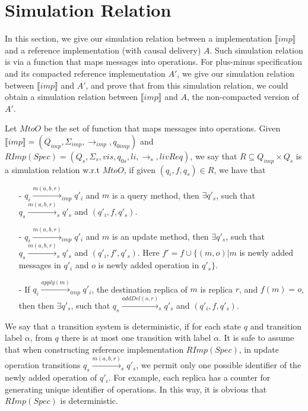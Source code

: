 
\section{Simulation Relation}
\label{sec:simulation relation}

In this section, we give our simulation relation between a implementation $\llbracket imp \rrbracket$ and a reference implementation (with causal delivery) $A$. Such simulation relation is via a function that maps messages into operations. For plus-minus specification and its compacted reference implementation $A'$, we give our simulation relation between $\llbracket imp \rrbracket$ and $A'$, and prove that from this simulation relation, we could obtain a simulation relation between $\llbracket imp \rrbracket$ and $A$, the non-compacted version of $A'$. 

Let $MtoO$ be the set of function that maps messages into operations. Given $\llbracket imp \rrbracket = (Q_{imp},\Sigma_{imp},\rightarrow_{imp},q_{0imp})$ and $RImp(Spec) = (Q_s,\Sigma_s,vis,q_{0s},li,\rightarrow_s,livReq)$, we say that $R \subseteq Q_{imp} \times Q_s$ is a simulation relation w.r.t $MtoO$, if given $(q_i,f,q_s) \in R$, we have that  

\begin{itemize}
\setlength{\itemsep}{0.5pt}
\item[-] $q_i {\xrightarrow{m(a,b,r)}}_{imp} q'_i$ and $m$ is a query method, then $\exists q'_s$, such that $q_s {\xrightarrow{m(a,b,r)}}_s q'_s$ and $(q'_i,f,q'_s)$. 

\item[-] $q_i {\xrightarrow{m(a,b,r)}}_{imp} q'_i$ and $m$ is an update method, then $\exists q'_s$, such that $q_s {\xrightarrow{m(a,b,r)}}_s q'_s$ and $(q'_i,f',q'_s)$. Here $f' = f \cup \{ (m,o) \vert m$ is newly added messages in $q'_i$ and $o$ is newly added operation in $q'_s\}$. 

\item[-] If $q_i {\xrightarrow{apply(m)}}_{imp} q'_i$, the destination replica of $m$ is replica $r$, and $f(m)=o$, then then $\exists q'_s$, such that $q_s {\xrightarrow{addDel(o,r)}}_s q'_s$ and $(q'_i,f,q'_s)$.
\end{itemize}

We say that a transition system is deterministic, if for each state $q$ and transition label $\alpha$, from $q$ there is at most one transition with label $\alpha$. {\color {red}It is safe to assume that when constructing reference implementation $RImp(Spec)$, in update operation transitions $q_s {\xrightarrow{m(a,b,r)}}_s q'_s$, we permit only one possible identifier of the newly added operation of $q'_i$. For example, each replica has a counter for generating unique identifier of operations. In this way, it is obvious that $RImp(Spec)$ is deterministic.} 






